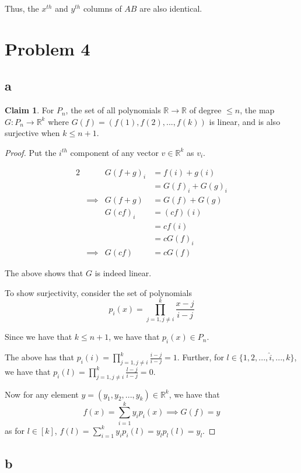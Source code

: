 \documentclass[12pt,letterpaper]{article}
\theoremstyle{definition}
\newtheorem*{claim}{Claim}
\newcommand{\R}{\mathbb{R}}
\begin{document}
Thus, the $x^{th}$ and $y^{th}$ columns of $AB$ are also identical.

\section*{Problem 4}

\subsection*{a}

\begin{claim}
  For $P_n$, the set of all polynomials $\R \rightarrow \R$ of degree $\leq n$,
  the map $G: P_n \rightarrow \R^k$ where $G(f) = (f(1), f(2), ..., f(k))$ is linear, and is also
  surjective when $k \leq n + 1$.
\end{claim}

\begin{proof}
  Put the $i^{th}$ component of any vector $v \in \R^k$ as $v_i$.
  
  \begin{alignat*}{2}
    && G(f + g)_{i} &= f(i) + g(i) \\
    && &= G(f)_i + G(g)_{i} \\
    &\implies& G(f + g) &= G(f) + G(g) \\
    && G(cf)_i &= (cf)(i) \\
    && &= cf(i) \\
    && &= cG(f)_i \\
    &\implies& G(cf) &= cG(f)
  \end{alignat*}

  The above shows that $G$ is indeed linear.

  To show surjectivity, consider the set of polynomials
  \[
    p_i(x) = \prod_{j=1, j \neq i}^k\frac{x - j}{i - j} 
  \]
  
  Since we have that $k \leq n + 1$, we have that $p_i(x) \in P_n$.

  The above has that $p_i(i) = \prod_{j=1, j \neq i}^k\frac{i - j}{i - j} = 1$. 
  Further, for $l \in \{1, 2, ..., \hat{i}, ..., k\}$, we have that $p_i(l) =
  \prod_{j=1, j\neq i}^k\frac{l - j}{i - j} = 0$.
  
  Now for any element $y = (y_1, y_2, ..., y_k) \in \R^k$, we have that
  \[
    f(x) = \sum_{i=1}^ky_ip_i(x) \implies G(f) = y
  \]
  as for $l \in [k]$, $f(l) = \sum_{i=1}^ky_ip_i(l) = y_lp_l(l) = y_l$.
\end{proof}

\subsection*{b}
\end{document}

